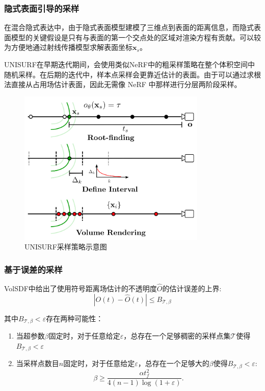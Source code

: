 \subsubsection{隐式表面引导的采样}
在混合隐式表达中，由于隐式表面模型建模了三维点到表面的距离信息，而隐式表面模型的关键假设是只有与表面的第一个交点处的区域对渲染方程有贡献。可以较为方便地通过射线传播模型求解表面坐标$\mathbf{x}_s$\cite{niemeyer_differentiable_2020}。

UNISURF\cite{oechsle_unisurf_2021}在早期迭代期间，会使用类似NeRF中的粗采样策略在整个体积空间中随机采样。在后期的迭代中，样本点采样会更靠近估计的表面。由于可以通过求根法\cite{niemeyer_differentiable_2020}直接从占用场估计表面，因此无需像 NeRF 中那样进行分层两阶段采样。

\begin{figure}[ht]
    \centering
    \includegraphics[width=0.8\textwidth]{undergraduate-thesis/images/unisurf-sampling.png}
    \caption{UNISURF\cite{oechsle_unisurf_2021}采样策略示意图}
    \label{fig:related-work unisurf-sampling}
\end{figure}

\subsubsection{基于误差的采样}
VolSDF\cite{yariv_volume_2021}中给出了使用符号距离场估计的不透明度$\hat{O}$的估计误差的上界:
\begin{equation}
    |O(t)-\hat{O}(t)|\leq B_{\mathcal{T},\beta}
\end{equation}

其中$B_{\mathcal{T},\beta}<\varepsilon$存在两种可能性：
\begin{enumerate}
    \item 当超参数$\beta$固定时，对于任意给定$\varepsilon$，总存在一个足够稠密的采样点集$\mathcal{T}$使得$B_{\mathcal{T},\beta}<\varepsilon$
    \item 当采样点数目$n$固定时，对于任意给定$\varepsilon$，总存在一个足够大的$\beta$使得$B_{\mathcal{T},\beta}<\varepsilon$:
    \begin{equation}
        \beta\geq\frac{\alpha t_f^2}{4(n-1)\log(1+\varepsilon)}.
        \label{eq: related-work volsdf beta-error}
    \end{equation}
\end{enumerate}

